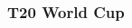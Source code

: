 \documentclass{beamer}
\begin{document}
\begin{frame}
  \frametitle{T20 World Cup}
  
	\begin{columns}
	
		\begin{column}{0.5\textwidth}
			 \begin{center}  \end{center}
		\end{column}
		

\end{columns}
\end{frame}
\end{document}

